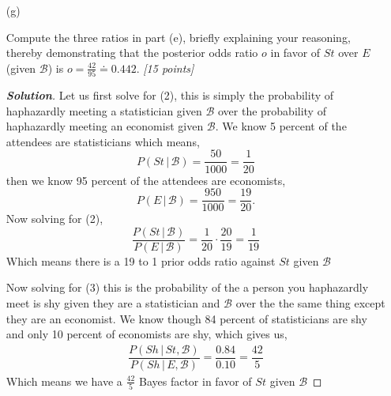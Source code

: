 \documentclass[12pt]{article}
\newcommand{\given}{\, | \,}
\newenvironment{solution}{\begin{proof}[\textbf{\textit{Solution}}] }{\end{proof}}
\begin{document}
\begin{itemize}
\begin{itemize}
\end{itemize}

Match these three terms with the numbers $( 1 ), ( 2 ), ( 3 )$ in the second line of the equation in part (e). \textit{[5 points]}
\begin{solution}
    \begin{align*}
        (1) &- \text{(Posterior odds ratio in favor of $St$ over $E$, given $\mathcal{ B }$)} \\
        (2) &- \text{(Prior odds ratio in favor of $St$ over $E$, given $\mathcal{ B }$)}\\
        (3) &- \text{(Bayes factor in favor of $St$ over $E$, given $\mathcal{ B }$)}
    \end{align*}
\end{solution}

\vspace*{0.5in}

\item[(g)]

Compute the three ratios in part (e), briefly explaining your reasoning, thereby demonstrating that the posterior odds ratio $o$ in favor of $St$ over $E$ (given $\mathcal{ B }$) is $o = \frac{ 42 }{ 95 } \doteq 0.442$. \textit{[15 points]}
\begin{solution}
    Let us first solve for (2), this is simply the probability of haphazardly meeting a statistician given $\mathcal{B}$ over the probability of haphazardly meeting an economist given $\mathcal{B}$. We know 5 percent of the attendees are statisticians which means,
    \[P(St \given \mathcal{B}) = \dfrac{50}{1000} = \dfrac{1}{20}\]
    then we know 95 percent of the attendees are economists,
    \[P(E \given \mathcal{B}) = \dfrac{950}{1000} = \dfrac{19}{20}.\]
    Now solving for (2),
    \[\dfrac{P(St \given \mathcal{B})}{P(E \given \mathcal{B})} = \dfrac{1}{20} \cdot \dfrac{20}{19} = \dfrac{1}{19}\]
    Which means there is a 19 to 1 prior odds ratio against $St$ given $\mathcal{B}$

    Now solving for (3) this is the probability of the a person you haphazardly meet is shy given they are a statistician and $\mathcal{B}$ over the the same thing except they are an economist. We know though 84 percent of statisticians are shy and only 10 percent of economists are shy, which gives us,
    \begin{align*}
        \dfrac{P(Sh \given St, \mathcal{B})}{P(Sh \given E, \mathcal{B})} = \dfrac{0.84}{0.10} = \dfrac{42}{5}
    \end{align*}
    Which means we have a $\frac{42}{5}$ Bayes factor in favor of $St$ given $\mathcal{B}$


\end{solution}
\end{itemize}
\end{document}
